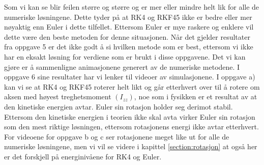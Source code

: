 \begin{center}
\begin{minipage}{0.45\textwidth}
\end{minipage}
\label{name_label}
\end{center}
Som vi kan se blir feilen større og større og er mer eller mindre helt lik for alle de numeriske løsningene. Dette tyder på at RK4 og RKF45 ikke er bedre eller mer nøyaktig enn Euler i dette tilfellet. Ettersom Euler er mye raskere og enklere vil dette være den beste metoden for denne situasjonen. Når det gjelder resultater fra oppgave 5 er det ikke godt å si hvilken metode som er best, ettersom vi ikke har en eksakt løsning for verdiene som er brukt i disse oppgavene. Det vi kan gjøre er å sammenligne animasjonene generert av de numeriske metodene.\newline \newline
I oppgave 6 sine resultater har vi lenker til videoer av simulasjonene. I oppgave a) kan vi se at RK4 og RKF45 roterer helt likt og går etterhvert over til å rotere om aksen med høyest treghetsmoment $(I_{zz})$, noe som i fysikken er et resultat av at den kinetiske energien avtar. Euler sin rotasjon holder seg derimot stabil. Ettersom den kinetiske energien i teorien ikke skal avta virker Euler sin rotasjon som den mest riktige løsningen, ettersom rotasjonens energi ikke avtar etterhvert. For videoene for oppgave b og c ser rotasjonene meget like ut for alle de numeriske løsningene, men vi vil se videre i kapittel \ref{section:rotasjon} at også her er det forskjell på energinivåene for RK4 og Euler.
